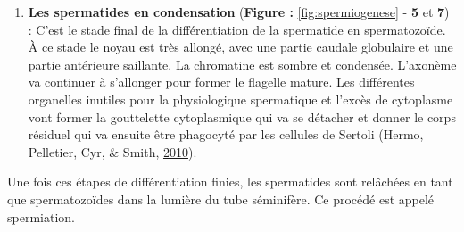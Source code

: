 \documentclass[12pt,twoside]{reedthesis}
\providecommand{\tightlist}{%
  \setlength{\itemsep}{0pt}\setlength{\parskip}{0pt}}
\theoremstyle{definition}
\theoremstyle{definition}
\theoremstyle{remark}
\begin{document}
  \newpage
  
  \begin{enumerate}
  \def\labelenumi{\arabic{enumi}.}
  \setcounter{enumi}{2}
  \tightlist
  \item
    \textbf{Les spermatides en condensation} (\textbf{Figure :
    }\ref{fig:spermiogenese} - \textbf{5} et \textbf{7}) : C'est le stade
    final de la différentiation de la spermatide en spermatozoïde. À ce
    stade le noyau est très allongé, avec une partie caudale globulaire et
    une partie antérieure saillante. La chromatine est sombre et
    condensée. L'axonème va continuer à s'allonger pour former le flagelle
    mature. Les différentes organelles inutiles pour la physiologique
    spermatique et l'excès de cytoplasme vont former la gouttelette
    cytoplasmique qui va se détacher et donner le corps résiduel qui va
    ensuite être phagocyté par les cellules de Sertoli (Hermo, Pelletier,
    Cyr, \& Smith, \protect\hyperlink{ref-Hermo2010}{2010}).
  \end{enumerate}
  
  Une fois ces étapes de différentiation finies, les spermatides sont
  relâchées en tant que spermatozoïdes dans la lumière du tube séminifère.
  Ce procédé est appelé spermiation.
  
\end{document}
